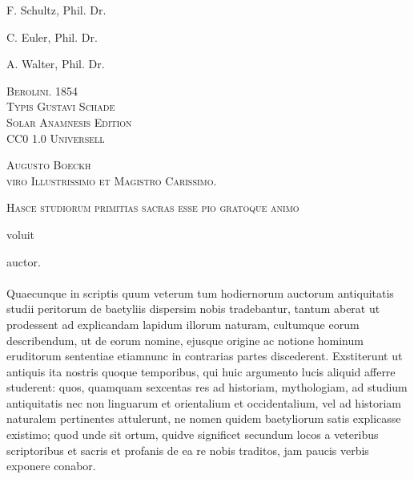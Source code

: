 \documentclass[a4paper, 11pt, oneside, polutonikogreek, german]{article}
\begin{document}
\begin{titlepage}
{    \bigskip

    F. Schultz, Phil. Dr.

    C. Euler, Phil. Dr.

    A. Walter, Phil. Dr.}    
    \vfill
    {\small\scshape Berolini. 1854}\\[0.2\baselineskip]
    {\small\scshape Typis Gustavi Schade}\\[0.5\baselineskip]

    {\scshape Solar Anamnesis Edition}\\[0.2\baselineskip]
    {\scshape\small CC0 1.0 Universell}
\end{titlepage}
\setlength{\parskip}{1mm plus1mm minus1mm}
\clearpage
\vspace*{\fill}
\begin{center}\scshape\large
Augusto Boeckh \\ viro Illustrissimo et Magistro Carissimo.
\end{center}

\bigskip

\begin{center}\scshape\large
Hasce studiorum primitias sacras esse pio gratoque animo

\bigskip

voluit

\bigskip

\hspace*{20mm}auctor.
\end{center}
\vspace*{\fill}
\clearpage
\paragraph{}
Quaecunque in scriptis quum veterum tum hodiernorum auctorum antiquitatis studii peritorum de baetyliis dispersim nobis tradebantur, tantum aberat ut prodessent ad explicandam lapidum illorum naturam, cultumque eorum describendum, ut de eorum nomine, ejusque origine ac notione hominum eruditorum sententiae etiamnunc in contrarias partes discederent. Exstiterunt ut antiquis ita nostris quoque temporibus, qui huic argumento lucis aliquid afferre studerent: quos, quamquam sexcentas res ad historiam, mythologiam, ad studium antiquitatis nec non linguarum et orientalium et occidentalium, vel ad historiam naturalem pertinentes attulerunt, ne nomen quidem baetyliorum satis explicasse existimo; quod unde sit ortum, quidve significet secundum locos a veteribus scriptoribus et sacris et profanis de ea re nobis traditos, jam paucis verbis exponere conabor.
\end{document}

